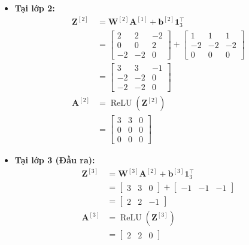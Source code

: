 \begin{itemize}
    \item \textbf{Tại lớp 2:}
    \begin{align*}
    \mathbf{Z}^{[2]} &= \mathbf{W}^{[2]}\mathbf{A}^{[1]} + \mathbf{b}^{[2]}\mathbf{1}_3^{\top} \\
    &= \begin{bmatrix} 2 & 2 & -2 \\ 0 & 0 & 2 \\ -2 & -2 & 0 \end{bmatrix} + \begin{bmatrix} 1 & 1 & 1 \\ -2 & -2 & -2 \\ 0 & 0 & 0 \end{bmatrix} \\
    &= \begin{bmatrix} 3 & 3 & -1 \\ -2 & -2 & 0 \\ -2 & -2 & 0 \end{bmatrix} \\
    \mathbf{A}^{[2]} &= \operatorname{ReLU}\!\left(\mathbf{Z}^{[2]}\right) \\
    &= \begin{bmatrix} 3 & 3 & 0 \\ 0 & 0 & 0 \\ 0 & 0 & 0 \end{bmatrix}
    \end{align*}

    \item \textbf{Tại lớp 3 (Đầu ra):}
    \begin{align*}
    \mathbf{Z}^{[3]} &= \mathbf{W}^{[3]}\mathbf{A}^{[2]} + \mathbf{b}^{[3]}\mathbf{1}_3^{\top} \\
    &= \begin{bmatrix} 3 & 3 & 0 \end{bmatrix} + \begin{bmatrix} -1 & -1 & -1 \end{bmatrix} \\
    &= \begin{bmatrix} 2 & 2 & -1 \end{bmatrix} \\
    \mathbf{A}^{[3]} &= \operatorname{ReLU}\!\left(\mathbf{Z}^{[3]}\right) \\
    &= \begin{bmatrix} 2 & 2 & 0 \end{bmatrix}
    \end{align*}
\end{itemize}

